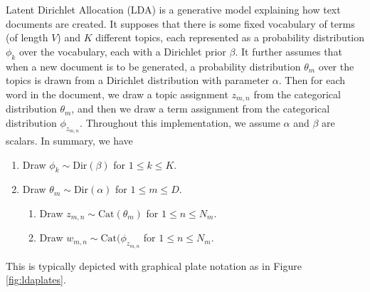 
Latent Dirichlet Allocation (LDA) is a generative model explaining how text documents are created. It supposes that there is some fixed vocabulary of terms (of length $V$) and $K$ different topics, each represented as a probability distribution $\phi_{k}$ over the vocabulary, each with a Dirichlet prior $\beta$. It further assumes that when a new document is to be generated, a probability distribution $\theta_{m}$ over the topics is drawn from a Dirichlet distribution with parameter $\alpha$. Then for each word in the document, we draw a topic assignment $z_{m,n}$ from the categorical distribution $\theta_{m}$, and then we draw a term assignment from the categorical distribution $\phi_{z_{m,n}}$. Throughout this implementation, we assume $\alpha$ and $\beta$ are scalars. In summary, we have
\begin{enumerate}
	\item Draw $\phi_{k} \sim \text{Dir}(\beta)$ for $1 \leq k \leq K$.
	\item Draw $\theta_{m} \sim \text{Dir}(\alpha)$ for $1 \leq m \leq D$.
	\begin{enumerate}
		\item Draw $z_{m,n} \sim \text{Cat}(\theta_{m})$ for $1 \leq n \leq N_{m}$.
		\item Draw $w_{m,n} \sim \text{Cat}(\phi_{z_{m,n}}$ for $1 \leq n \leq N_{m}$.
	\end{enumerate}
\end{enumerate}
This is typically depicted with graphical plate notation as in Figure \ref{fig:ldaplates}.
